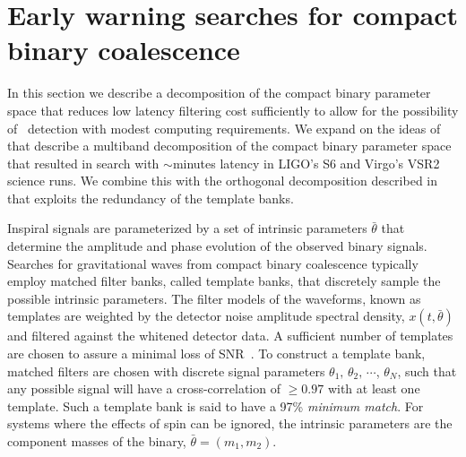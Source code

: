 \section{Early warning searches for compact binary coalescence}
\label{SECII}\label{sec:method}

In this section we describe a decomposition of the compact binary parameter
space that reduces low latency filtering cost sufficiently to allow for the
possibility of \earlywarning\ detection with modest computing requirements.  We
expand on the ideas of~\cite{Marion2004, Buskulic2010} that describe a
multiband decomposition of the compact binary parameter space that resulted in
search with $\sim$minutes latency in LIGO's S6 and Virgo's VSR2 science runs.
We combine this with the orthogonal decomposition described
in~\cite{Cannon:2010p10398} that exploits the redundancy of the template banks.

Inspiral signals are parameterized by a set of intrinsic parameters
$\bar{\theta}$ that determine the amplitude and phase evolution of the observed
binary signals.  Searches for gravitational waves from compact binary
coalescence typically employ matched filter banks, called template banks,
\cite{findchirppaper} that discretely sample the possible intrinsic parameters.
The filter models of the waveforms, known as templates are weighted by the
detector noise amplitude spectral density, $x(t,\bar{\theta})$ and filtered
against the whitened detector data.  A sufficient number of templates are
chosen to assure a minimal loss of SNR~\cite{Owen:1995tm,Owen:1998dk}.  To
construct a template bank, matched filters are chosen with discrete signal
parameters $\theta_1,\, \theta_2,\, \cdots$, $\theta_N$, such that any possible
signal will have a cross-correlation of $\geq0.97$ with at least one template.
Such a template bank is said to have a 97\% {\em minimum match}. For systems
where the effects of spin can be ignored, the intrinsic parameters are the
component masses of the binary, $\bar{\theta} = (m_1, m_2)$. 


